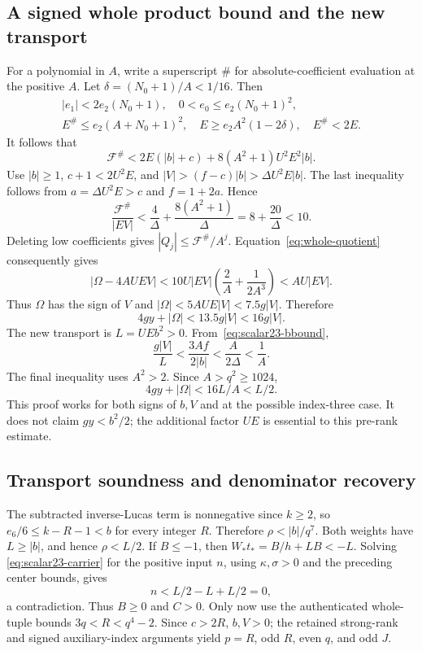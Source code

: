 \subsection{A signed whole product bound and the new transport}
For a polynomial in $A$, write a superscript $\#$ for absolute-coefficient
evaluation at the positive $A$. Let $\delta=(N_0+1)/A<1/16$. Then
\begin{gather*}
 |e_1|<2e_2(N_0+1),\quad 0<e_0\le e_2(N_0+1)^2,\\
 E^\#\le e_2(A+N_0+1)^2,
 \quad E\ge e_2A^2(1-2\delta),\quad E^\#<2E.
\end{gather*}
It follows that
\[
 \mathcal F^\#<2E(|b|+c)+8(A^2+1)U^2E^2|b|.
\]
Use $|b|\ge1$, $c+1<2U^2E$, and
$|V|>(f-c)|b|>\Delta U^2E|b|$. The last inequality follows from
$a=\Delta U^2E>c$ and $f=1+2a$. Hence
\[
 \frac{\mathcal F^\#}{|EV|}
 <\frac4\Delta+\frac{8(A^2+1)}\Delta=8+\frac{20}\Delta<10.
\]
Deleting low coefficients gives $|Q_j|\le\mathcal F^\#/A^j$.
Equation~\eqref{eq:whole-quotient} consequently gives
\[
 |\Omega-4AUEV|
 <10U|EV|\left(\frac2A+\frac1{2A^3}\right)<AU|EV|.
\]
Thus $\Omega$ has the sign of $V$ and
$|\Omega|<5AUE|V|<7.5g|V|$. Therefore
\[
 4gy+|\Omega|<13.5g|V|<16g|V|.
\]
The new transport is $L=UEb^2>0$. From~\eqref{eq:scalar23-bbound},
\[
 \frac{g|V|}{L}<\frac{3Af}{2|b|}
 <\frac{A}{2\Delta}<\frac1A.
\]
The final inequality uses $A^2>2$. Since $A>q^2\ge1024$,
\begin{equation}\label{eq:newtransport}
 4gy+|\Omega|<16L/A<L/2.
\end{equation}
This proof works for both signs of $b,V$ and at the possible index-three
case. It does not claim $gy<b^2/2$; the additional factor $UE$ is essential
to this pre-rank estimate.

\subsection{Transport soundness and denominator recovery}
The subtracted inverse-Lucas term is nonnegative since $k\ge2$, so
$e_6/6\le k-R-1<b$ for every integer $R$. Therefore
$\rho<|b|/q^7$. Both weights have $L\ge|b|$, and hence $\rho<L/2$.
If $B\le-1$, then $W_*t_*=B/h+LB<-L$. Solving
\eqref{eq:scalar23-carrier} for the positive input $n$, using
$\kappa,\sigma>0$ and the preceding center bounds, gives
\[
 n<L/2-L+L/2=0,
\]
a contradiction. Thus $B\ge0$ and $C>0$. Only now use the authenticated
whole-tuple bounds $3q<R<q^4-2$. Since $c>2R$, $b,V>0$; the retained
strong-rank and signed auxiliary-index arguments yield $p=R$, odd $R$,
even $q$, and odd $J$.

